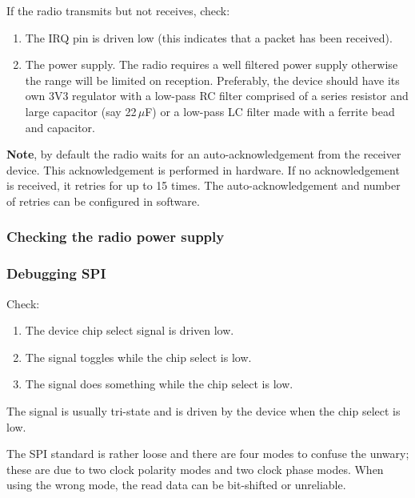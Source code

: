 If the radio transmits but not receives, check:

\begin{enumerate}
\item
  The IRQ pin is driven low (this indicates that a packet has been
  received).
\item
  The power supply. The radio requires a well filtered power supply
  otherwise the range will be limited on reception. Preferably, the
  device should have its own 3V3 regulator with a low-pass RC filter
  comprised of a series resistor and large capacitor (say 22\,$\mu$F) or a
  low-pass LC filter made with a ferrite bead and capacitor.
\end{enumerate}

\textbf{Note}, by default the radio waits for an auto-acknowledgement
from the receiver device. This acknowledgement is performed in hardware.
If no acknowledgement is received, it retries for up to 15 times. The
auto-acknowledgement and number of retries can be configured in
software.

\subsubsection{Checking the radio power supply}
\label{checking-the-radio-power-supply}


\subsubsection{Debugging SPI}
\label{debugging-spi}

Check:
%
\begin{enumerate}
\item The device chip select signal is driven low.
\item The  signal toggles while the chip select is low.
\item The  signal does something while the chip select is low.
\end{enumerate}
%
The  signal is usually tri-state and is driven by the
device when the chip select is low.

The SPI standard is rather loose and there are four modes to confuse
the unwary; these are due to two clock polarity modes and two clock
phase modes.  When using the wrong mode, the read data can be
bit-shifted or unreliable.



